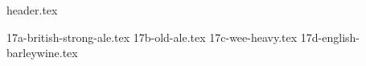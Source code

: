 \clearpage
{}
\divisorLine
{header.tex}
\begin{multicols}{2}
{17a-british-strong-ale.tex}
{17b-old-ale.tex}
{17c-wee-heavy.tex}
{17d-english-barleywine.tex}
\end{multicols}